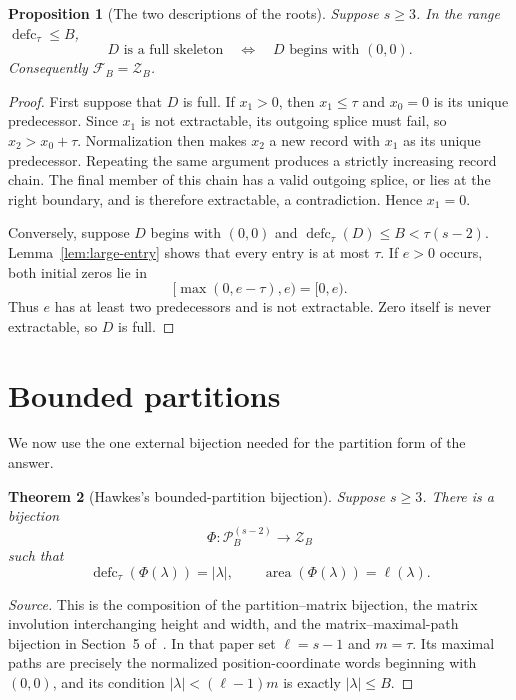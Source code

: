 \documentclass[11pt]{article}
\newtheorem{theorem}{Theorem}[section]
\newtheorem{proposition}[theorem]{Proposition}
\theoremstyle{definition}
\theoremstyle{remark}
\newcommand{\area}{\operatorname{area}}
\newcommand{\defc}{\operatorname{defc}}
\begin{document}
\begin{proposition}[The two descriptions of the roots]
\label{prop:full-zero}
Suppose $s\ge3$.
In the range $\defc_\tau\le B$,
\[
  D\text{ is a full skeleton}
  \quad\Longleftrightarrow\quad
  D\text{ begins with }(0,0).
\]
Consequently $\mathcal F_B=\mathcal Z_B$.
\end{proposition}

\begin{proof}
First suppose that $D$ is full.  If $x_1>0$, then $x_1\le\tau$ and $x_0=0$
is its unique predecessor.  Since $x_1$ is not extractable, its outgoing
splice must fail, so $x_2>x_0+\tau$.  Normalization then makes $x_2$ a new
record with $x_1$ as its unique predecessor.  Repeating the same argument
produces a strictly increasing record chain.  The final member of this chain
has a valid outgoing splice, or lies at the right boundary, and is therefore
extractable, a contradiction.  Hence $x_1=0$.

Conversely, suppose $D$ begins with $(0,0)$ and
$\defc_\tau(D)\le B<\tau(s-2)$.  Lemma~\ref{lem:large-entry} shows that every
entry is at most $\tau$.  If $e>0$ occurs, both initial zeros lie in
\[
  [\max(0,e-\tau),e)=[0,e).
\]
Thus $e$ has at least two predecessors and is not extractable.  Zero itself
is never extractable, so $D$ is full.
\end{proof}

\section{Bounded partitions}

We now use the one external bijection needed for the partition form of the
answer.

\begin{theorem}[Hawkes's bounded-partition bijection]
\label{thm:partition-bijection}
Suppose $s\ge3$.
There is a bijection
\[
  \Phi:\mathcal P_B^{(s-2)}\longrightarrow\mathcal Z_B
\]
such that
\begin{equation}
  \defc_\tau(\Phi(\lambda))=|\lambda|,
  \qquad
  \area(\Phi(\lambda))=\ell(\lambda).
  \label{eq:partition-statistics}
\end{equation}
\end{theorem}

\begin{proof}[Source]
This is the composition of the partition--matrix bijection, the matrix
involution interchanging height and width, and the matrix--maximal-path
bijection in Section~5 of~\cite{Hawkes2024}.  In that paper set
$\ell=s-1$ and $m=\tau$.  Its maximal paths are precisely the normalized
position-coordinate words beginning with $(0,0)$, and its condition
$|\lambda|<(\ell-1)m$ is exactly $|\lambda|\le B$.
\end{proof}
\end{document}
